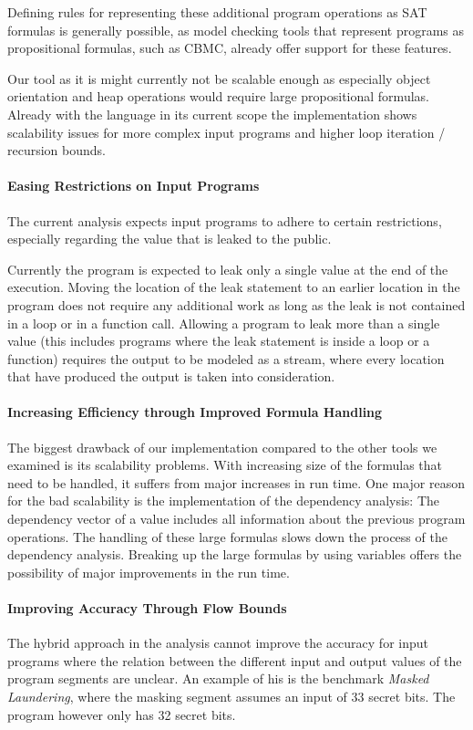 Defining rules for representing these additional program operations as SAT formulas is generally possible, as model checking tools that represent programs as propositional formulas, such as CBMC, already offer support for these features.

Our tool as it is might currently not be scalable enough as especially object orientation and heap operations would require large propositional formulas. Already with the language in its current scope the implementation shows scalability issues for more complex input programs and higher loop iteration / recursion bounds.

\paragraph{Easing Restrictions on Input Programs}
The current analysis expects input programs to adhere to certain restrictions, especially regarding the value that is leaked to the public.

Currently the program is expected to leak only a single value at the end of the execution. Moving the location of the leak statement to an earlier location in the program does not require any additional work as long as the leak is not contained in a loop or in a function call. Allowing a program to leak more than a single value (this includes programs where the leak statement is inside a loop or a function) requires the output to be modeled as a stream, where every location that have produced the output is taken into consideration.

\paragraph{Increasing Efficiency through Improved Formula Handling}
The biggest drawback of our implementation compared to the other tools we examined is its scalability problems. With increasing size of the formulas that need to be handled, it suffers from major increases in run time. One major reason for the bad scalability is the implementation of the dependency analysis: The dependency vector of a value includes all information about the previous program operations. The handling of these large formulas slows down the process of the dependency analysis. Breaking up the large formulas by using variables offers the possibility of major improvements in the run time. 

\paragraph{Improving Accuracy Through Flow Bounds}
The hybrid approach in the analysis cannot improve the accuracy for input programs where the relation between the different input and output values of the program segments are unclear. An example of his is the benchmark \emph{Masked Laundering}, where the masking segment assumes an input of 33 secret bits. The program however only has 32 secret bits.

